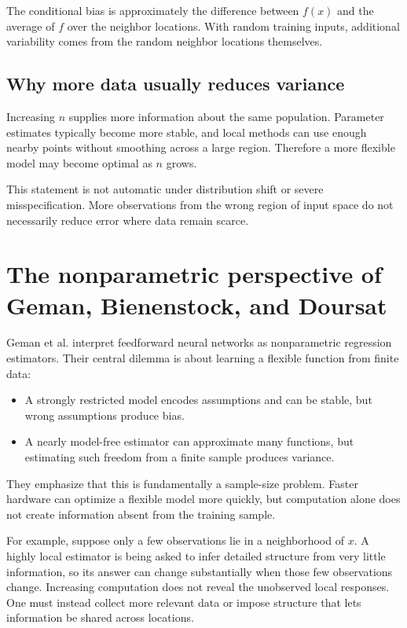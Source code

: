 \documentclass[11pt,a4paper]{article}
\begin{document}
The conditional bias is approximately the difference between $f(x)$ and the average of $f$ over the neighbor locations. With random training inputs, additional variability comes from the random neighbor locations themselves.

\subsection{Why more data usually reduces variance}

Increasing $n$ supplies more information about the same population. Parameter estimates typically become more stable, and local methods can use enough nearby points without smoothing across a large region. Therefore a more flexible model may become optimal as $n$ grows.

This statement is not automatic under distribution shift or severe misspecification. More observations from the wrong region of input space do not necessarily reduce error where data remain scarce.

\section{The nonparametric perspective of Geman, Bienenstock, and Doursat}

Geman et al. interpret feedforward neural networks as nonparametric regression estimators. Their central dilemma is about learning a flexible function from finite data:
\begin{itemize}
  \item A strongly restricted model encodes assumptions and can be stable, but wrong assumptions produce bias.
  \item A nearly model-free estimator can approximate many functions, but estimating such freedom from a finite sample produces variance.
\end{itemize}

They emphasize that this is fundamentally a sample-size problem. Faster hardware can optimize a flexible model more quickly, but computation alone does not create information absent from the training sample.

For example, suppose only a few observations lie in a neighborhood of $x$. A highly local estimator is being asked to infer detailed structure from very little information, so its answer can change substantially when those few observations change. Increasing computation does not reveal the unobserved local responses. One must instead collect more relevant data or impose structure that lets information be shared across locations.
\end{document}

